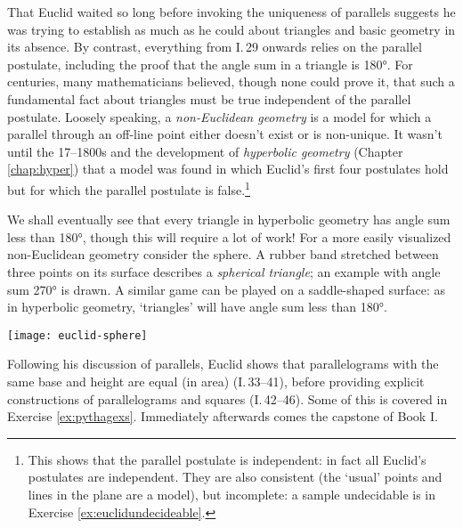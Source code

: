 That Euclid waited so long before invoking the uniqueness of parallels suggests he was trying to establish as much as he could about triangles and basic geometry in its absence. By contrast, everything from I.\,29 onwards relies on the parallel postulate, including the proof that the angle sum in a triangle is \ang{180}. For centuries, many mathematicians believed, though none could prove it, that such a fundamental fact about triangles must be true independent of the parallel postulate.\smallbreak
Loosely speaking, a \emph{non-Euclidean geometry} is a model for which a parallel through an off-line point either doesn't exist or is non-unique. It wasn't until the 17--1800s and the development of \emph{hyperbolic geometry} (Chapter \ref{chap:hyper}) that a model was found in which Euclid's first four postulates hold but for which the parallel postulate is false.\footnote{This shows that the parallel postulate is independent: in fact all Euclid's postulates are independent. They are also consistent (the `usual' points and lines in the plane are a model), but incomplete: a sample undecidable is in Exercise \ref{ex:euclidundecideable}.}\par

\begin{minipage}[t]{0.76\linewidth}\vspace{-5pt}
	We shall eventually see that every triangle in hyperbolic geometry has angle sum less than \ang{180}, though this will require a lot of work! For a more easily visualized non-Euclidean geometry consider the sphere. A rubber band stretched between three points on its surface describes a \emph{spherical triangle}; an example with angle sum \ang{270} is drawn. A similar game can be played on a saddle-shaped surface: as in hyperbolic geometry, `triangles' will have angle sum less than \ang{180}.
\end{minipage}
\hfill
\begin{minipage}[t]{0.23\linewidth}\vspace{-10pt}
	\flushright
	\texttt{[image: euclid-sphere]}
\end{minipage}

\goodbreak

\goodbreak



Following his discussion of parallels, Euclid shows that parallelograms with the same base and height are equal (in area) (I.\,33--41), before providing explicit constructions of parallelograms and squares (I.\,42--46). Some of this is covered in Exercise \ref{ex:pythagexs}. Immediately afterwards comes the capstone of Book I.


